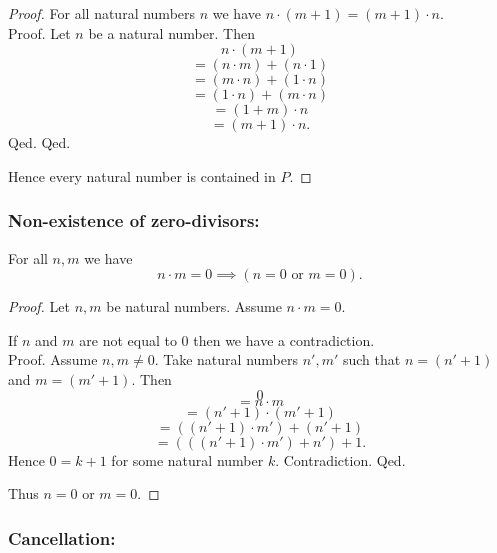 \documentclass[../../arithmetic.tex]{subfiles}
\begin{document}
\begin{forthel}
\begin{proof}
        For all natural numbers $n$ we have $n \cdot (m + 1) = (m + 1) \cdot n$. \\
        Proof.
          Let $n$ be a natural number.
          Then
          \[ n \cdot (m + 1) \]
          \[ = (n \cdot m) + (n \cdot 1) \]
          \[ = (m \cdot n) + (1 \cdot n) \]
          \[ = (1 \cdot n) + (m \cdot n) \]
          \[ = (1 + m) \cdot n \]
          \[ = (m + 1) \cdot n. \]
        Qed.
      Qed.

      Hence every natural number is contained in $P$.
    \end{proof}
  \end{forthel}


  \subsubsection*{Non-existence of zero-divisors:}

  \begin{forthel}
    \begin{proposition}\label{Arithmetic_01_03_692941}
      For all $n,m$ we have \[ n \cdot m = 0 \implies (\text{$n = 0$ or $m = 0$}). \]
    \end{proposition}
    \begin{proof}
      Let $n,m$ be natural numbers.
      Assume $n \cdot m = 0$.

      If $n$ and $m$ are not equal to $0$ then we have a contradiction. \\
      Proof.
        Assume $n,m \neq 0$.
        Take natural numbers $n',m'$ such that $n = (n' + 1)$ and $m = (m' + 1)$.
        Then
        \[   0 \]
        \[ = n \cdot m \]
        \[ = (n' + 1) \cdot (m' + 1) \]
        \[ = ((n' + 1) \cdot m') + (n' + 1) \]
        \[ = (((n' + 1) \cdot m') + n') + 1. \]
        Hence $0 = k + 1$ for some natural number $k$.
        Contradiction.
      Qed.

      Thus $n = 0$ or $m = 0$.
    \end{proof}
  \end{forthel}


  \subsubsection*{Cancellation:}
\end{document}
